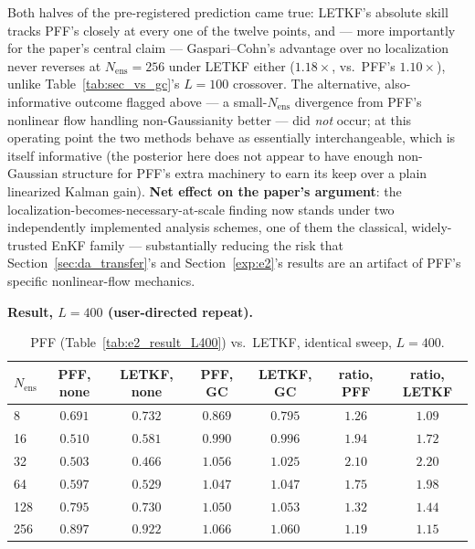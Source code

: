 \documentclass[11pt]{article}
\begin{document}
Both halves of the pre-registered prediction came true: LETKF's
absolute skill tracks PFF's closely at every one of the twelve points,
and --- more importantly for the paper's central claim ---
Gaspari--Cohn's advantage over no localization never reverses at
$N_{\mathrm{ens}}=256$ under LETKF either ($1.18\times$, vs.\ PFF's
$1.10\times$), unlike Table~\ref{tab:sec_vs_gc}'s $L=100$ crossover.
The alternative, also-informative outcome flagged above --- a
small-$N_{\mathrm{ens}}$ divergence from PFF's nonlinear flow handling
non-Gaussianity better --- did \emph{not} occur; at this operating
point the two methods behave as essentially interchangeable, which is
itself informative (the posterior here does not appear to have enough
non-Gaussian structure for PFF's extra machinery to earn its keep
over a plain linearized Kalman gain). \textbf{Net effect on the
paper's argument}: the localization-becomes-necessary-at-scale finding
now stands under two independently implemented analysis schemes, one
of them the classical, widely-trusted EnKF family --- substantially
reducing the risk that Section~\ref{sec:da_transfer}'s and
Section~\ref{exp:e2}'s results are an artifact of PFF's specific
nonlinear-flow mechanics.

\textbf{Result, $L=400$ (user-directed repeat).}

\begin{table}[h]
\centering
\begin{tabular}{lcccccc}
\toprule
$N_{\mathrm{ens}}$ & PFF, none & LETKF, none & PFF, GC & LETKF, GC & ratio, PFF & ratio, LETKF \\
\midrule
8   & $0.691$ & $0.732$ & $0.869$ & $0.795$ & $1.26$ & $1.09$ \\
16  & $0.510$ & $0.581$ & $0.990$ & $0.996$ & $1.94$ & $1.72$ \\
32  & $0.503$ & $0.466$ & $1.056$ & $1.025$ & $2.10$ & $2.20$ \\
64  & $0.597$ & $0.529$ & $1.047$ & $1.047$ & $1.75$ & $1.98$ \\
128 & $0.795$ & $0.730$ & $1.050$ & $1.053$ & $1.32$ & $1.44$ \\
256 & $0.897$ & $0.922$ & $1.066$ & $1.060$ & $1.19$ & $1.15$ \\
\bottomrule
\end{tabular}
\caption{PFF (Table~\ref{tab:e2_result_L400}) vs.\ LETKF, identical
sweep, $L=400$.}
\label{tab:e7_result_L400}
\end{table}
\end{document}
